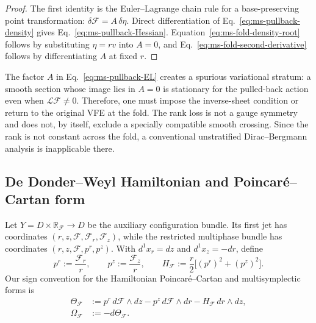 \begin{proof}
The first identity is the Euler--Lagrange chain rule for a base-preserving
point transformation: $\delta\mathcal F=A\,\delta\eta$. Direct
differentiation of Eq.~\eqref{eq:ms-pullback-density} gives
Eq.~\eqref{eq:ms-pullback-Hessian}. Equation~\eqref{eq:ms-fold-density-root}
follows by substituting $\eta=rv$ into $A=0$, and
Eq.~\eqref{eq:ms-fold-second-derivative} follows by differentiating $A$ at
fixed $r$.
\end{proof}

\begin{remark}
\label{rem:ms-fold-caution}
The factor $A$ in Eq.~\eqref{eq:ms-pullback-EL} creates a spurious
variational stratum: a smooth section whose image lies in $A=0$ is stationary
for the pulled-back action even when $\mathcal L\mathcal F\neq0$. Therefore,
one must impose the inverse-sheet condition or return to the original VFE at
the fold. The rank loss is not a gauge symmetry and does not, by itself,
exclude a specially compatible smooth crossing. Since the rank is not
constant across the fold, a conventional unstratified Dirac--Bergmann
analysis is inapplicable there.
\end{remark}

\subsection{De Donder--Weyl Hamiltonian and Poincar\'e--Cartan form}

Let $Y=D\times\mathbb R_{\mathcal F}\to D$ be the auxiliary configuration
bundle. Its first jet has coordinates
$(r,z,\mathcal F,\mathcal F_r,\mathcal F_z)$, while the restricted
multiphase bundle has coordinates $(r,z,\mathcal F,p^r,p^z)$. With
$d^1x_r=dz$ and $d^1x_z=-dr$, define
\begin{equation}
p^r:=\frac{\mathcal F_r}{r},
\qquad
p^z:=\frac{\mathcal F_z}{r},
\qquad
H_{\mathcal F}:=\frac r2\bigl[(p^r)^2+(p^z)^2\bigr].
\label{eq:ms-F-polymomenta-Hamiltonian}
\end{equation}
Our sign convention for the Hamiltonian Poincar\'e--Cartan and
multisymplectic forms is
\begin{align}
\Theta_{\mathcal F}
&:=p^r\,d\mathcal F\wedge dz
-p^z\,d\mathcal F\wedge dr
-H_{\mathcal F}\,dr\wedge dz,
\label{eq:ms-F-Cartan-form}\\
\Omega_{\mathcal F}&:=-d\Theta_{\mathcal F}.
\label{eq:ms-F-multisymplectic-form}
\end{align}

